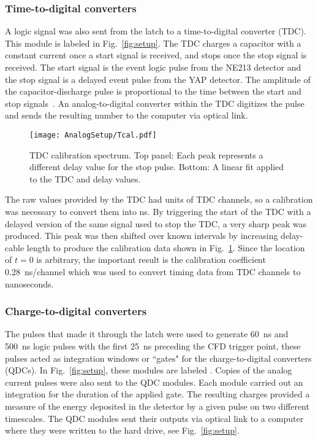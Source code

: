 \documentclass[main.tex]{subfiles}
\begin{document}
\subsubsection{Time-to-digital converters}
A logic signal was also sent from the latch to a time-to-digital converter (TDC). This module is labeled  in Fig.~\ref{fig:setup}. The TDC charges a capacitor with a constant current once a start signal is received, and stops once the stop signal is received. The start signal is the event logic pulse from the NE213 detector and the stop signal is a delayed event pulse from the YAP detector. The amplitude of the capacitor-discharge pulse is proportional to the time between the start and stop signals~\cite{CAENTDC}. An analog-to-digital converter within the TDC digitizes the pulse and sends the resulting number to the computer via optical link.
\begin{figure}[h]
	\centering
    	\texttt{[image: AnalogSetup/Tcal.pdf]}
        \caption[TDC calibration spectrum.]{TDC calibration spectrum. Top panel: Each peak represents a different delay value for the stop pulse. Bottom: A linear fit applied to the TDC and delay values.}
	    \label{fig:Tcal} 
\end{figure}

The raw values provided by the TDC had units of TDC channels, so a calibration was necessary to convert them into ns. By triggering the start of the TDC with a delayed version of the same signal used to stop the TDC, a very sharp peak was produced. This peak was then shifted over known intervals by increasing delay-cable length to produce the calibration data shown in Fig.~\ref{fig:Tcal}. Since the location of $t=0$ is arbitrary, the important result is the calibration coefficient \SI{0.28}{\nano\second/channel} which was used to convert timing data from TDC channels to nanoseconds.

\subsubsection{Charge-to-digital converters}\label{sec:Ecal_A}
The pulses that made it through the latch were used to generate \SI{60}{\ns} and \SI{500}{\ns} logic pulses with the first \SI{25}{\ns} preceding the CFD trigger point, these pulses acted as integration windows or ``gates" for the charge-to-digital converters (QDCs). In Fig.~\ref{fig:setup}, these modules are labeled . Copies of the analog current pulses were also sent to the QDC modules. Each module carried out an integration for the duration of the applied gate. The resulting charges provided a measure of the energy deposited in the detector by a given pulse on two different timescales. The QDC modules sent their outputs via optical link to a computer where they were written to the hard drive, see Fig.~\ref{fig:setup}.
\end{document}
